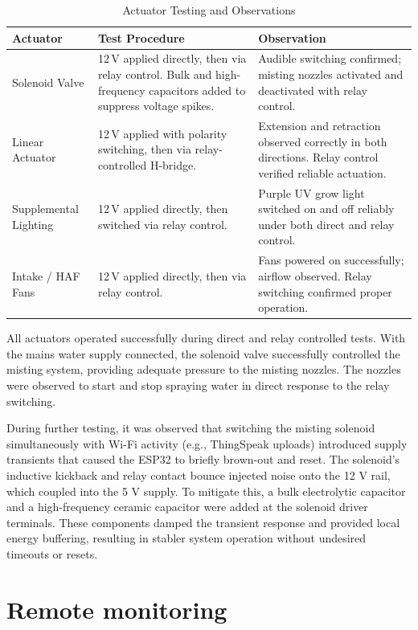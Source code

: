 \begin{table}[H]
	\centering
	\small
	\caption{Actuator Testing and Observations}
	\label{tab:actuator_tests}
	\begin{tabular}{|p{3cm}|p{6cm}|p{6cm}|}
		\hline
		\textbf{Actuator} & \textbf{Test Procedure} & \textbf{Observation} \\
		\hline
		Solenoid Valve & 12\,V applied directly, then via relay control. Bulk and high-frequency capacitors added to suppress voltage spikes. & Audible switching confirmed; misting nozzles activated and deactivated with relay control. \\
		\hline
		Linear Actuator & 12\,V applied with polarity switching, then via relay-controlled H-bridge. & Extension and retraction observed correctly in both directions. Relay control verified reliable actuation. \\
		\hline
		Supplemental Lighting & 12\,V applied directly, then switched via relay control. & Purple UV grow light switched on and off reliably under both direct and relay control. \\
		\hline
		Intake / HAF Fans & 12\,V applied directly, then via relay control. & Fans powered on successfully; airflow observed. Relay switching confirmed proper operation. \\
		\hline
	\end{tabular}
\end{table}

All actuators operated successfully during direct and relay controlled tests. With the mains water supply connected, the solenoid valve successfully controlled the misting system, providing adequate pressure to the misting nozzles. The nozzles were observed to start and stop spraying water in direct response to the relay switching.

During further testing, it was observed that switching the misting solenoid simultaneously with Wi-Fi activity (e.g., ThingSpeak uploads) introduced supply transients that caused the ESP32 to briefly brown-out and reset. The solenoid’s inductive kickback and relay contact bounce injected noise onto the 12 V rail, which coupled into the 5 V supply. To mitigate this, a bulk electrolytic capacitor and a high-frequency ceramic capacitor were added at the solenoid driver terminals. These components damped the transient response and provided local energy buffering, resulting in stabler system operation without undesired timeouts or resets.

\section{Remote monitoring}


